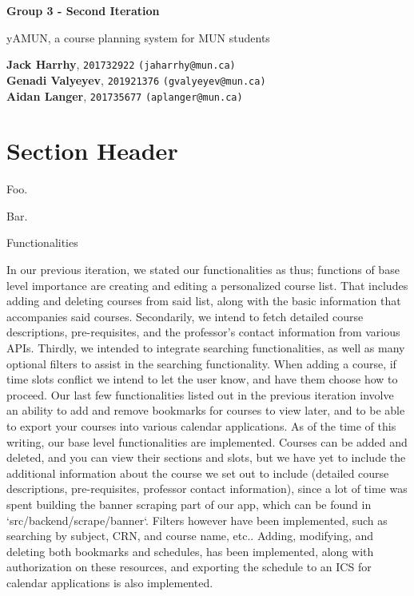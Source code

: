 \documentclass[12pt]{article}
\begin{document}
\begin{titlepage}
    \begin{center}
        \vspace*{1cm}
            
        \Huge
        \textbf{Group 3 - Second Iteration}
            
        \vspace{0.5cm}
        \LARGE
        yAMUN, a course planning system for MUN students
            
        \vspace{1.5cm}
            
        \textbf{Jack Harrhy}, \texttt{201732922} \texttt{(jaharrhy@mun.ca)} \\
        \textbf{Genadi Valyeyev}, \texttt{201921376} \texttt{(gvalyeyev@mun.ca)}\\
        \textbf{Aidan Langer}, \texttt{201735677} \texttt{(aplanger@mun.ca)}\\
            
        \vfill
    \end{center}
\end{titlepage}
\section{Section Header}
Foo. \par
Bar.

Functionalities

	In our previous iteration, we stated our functionalities as thus; functions of base level importance are creating and editing a personalized course list. That includes adding and deleting courses from said list, along with the basic information that accompanies said courses. Secondarily, we intend to fetch detailed course descriptions, pre-requisites, and the professor’s contact information from various APIs. Thirdly, we intended to integrate searching functionalities, as well as many optional filters to assist in the searching functionality. When adding a course, if time slots conflict we intend to let the user know, and have them choose how to proceed. Our last few functionalities listed out in the previous iteration involve an ability to add and remove bookmarks for courses to view later, and to be able to export your courses into various calendar applications.
As of the time of this writing, our base level functionalities are implemented. Courses can be added and deleted, and you can view their sections and slots, but we have yet to include the additional information about the course we set out to include (detailed course descriptions, pre-requisites, professor contact information), since a lot of time was spent building the banner scraping part of our app, which can be found in `src/backend/scrape/banner`. Filters however have been implemented, such as searching by subject, CRN, and course name, etc.. Adding, modifying, and deleting both bookmarks and schedules, has been implemented, along with authorization on these resources, and exporting the schedule to an ICS for calendar applications is also implemented.
\end{document}
